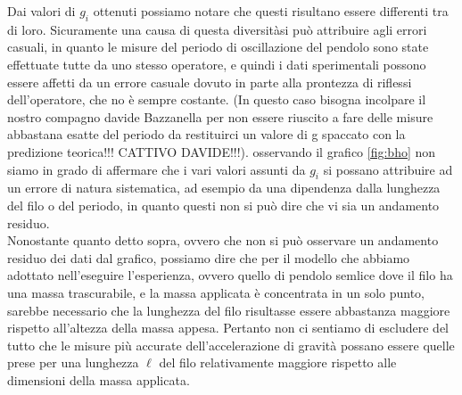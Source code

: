 Dai valori di $g_i$ ottenuti possiamo notare che questi risultano essere differenti tra di loro. Sicuramente una causa di questa diversitàsi può attribuire agli errori casuali, in quanto le misure del periodo di oscillazione del pendolo sono state effettuate tutte da uno stesso operatore, e quindi i dati sperimentali possono essere affetti da un errore casuale dovuto in parte alla prontezza di riflessi dell'operatore, che no è sempre costante. (In questo caso bisogna incolpare il nostro compagno davide Bazzanella per non essere riuscito a fare delle misure abbastana esatte del periodo da restituirci un valore di g spaccato con la predizione teorica!!! CATTIVO DAVIDE!!!). osservando il grafico \ref{fig:bho} non siamo in grado di affermare che i vari valori assunti da $g_i$ si possano attribuire ad un errore di natura sistematica, ad esempio da una dipendenza dalla lunghezza del filo o del periodo, in quanto questi non si può dire che vi sia un andamento residuo.\\
Nonostante quanto detto sopra, ovvero che non si può osservare un andamento residuo dei dati dal grafico, possiamo dire che per il modello che abbiamo adottato nell'eseguire l'esperienza, ovvero quello di pendolo semlice dove il filo ha una massa trascurabile, e la massa applicata è concentrata in un solo punto, sarebbe necessario che la lunghezza del filo risultasse essere abbastanza maggiore rispetto all'altezza della massa appesa. Pertanto non ci sentiamo di escludere del tutto che le misure più accurate dell'accelerazione di gravità possano essere quelle prese per una lunghezza $\ell$ del filo relativamente maggiore rispetto alle dimensioni della massa applicata.